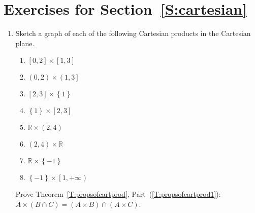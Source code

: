 \section*{Exercises for Section~\ref{S:cartesian}}
%
\begin{enumerate}
\xitem Let   $A = \left\{ {1,2} \right\}$,  $B = \left\{ {a,b,c,d} \right\}$, and  $C = \left\{ {1,a,b} \right\}$.  Use the roster method to list all of the elements of each of the following sets: \label{exer:sec44-1}

\begin{multicols}{2} \begin{enumerate}
\item $A \times B$
\item $B \times A$
\item $A \times C$
\item $A^2$
\item $A \times \left( {B \cap C} \right)$
\item $\left( {A \times B} \right) \cap \left( {A \times C} \right)$
\item $A \times \emptyset $
\item $B \times \left\{ 2 \right\}$
\end{enumerate}
\end{multicols}


\item Sketch a graph of each of the following Cartesian products in the Cartesian plane.
\label{exer:sec44-2}
%
\begin{multicols}{2}
\begin{enumerate}
  \item $\left[ {0,2} \right] \times \left[ {1,3} \right]$
  \item $\left( {0,2} \right) \times \left( {1,3} \right]$
  \item $\left[ {2,3} \right] \times \left\{ 1 \right\}$
  \item $\left\{ 1 \right\} \times \left[ {2,3} \right]$
  \item $\mathbb{R} \times \left( {2,4} \right)$
  \item $\left( {2,4} \right) \times \mathbb{R}$
  \item $\mathbb{R} \times \left\{ { - 1} \right\}$
  \item $\left\{ { - 1} \right\} \times \left[ {1, + \infty } \right)$
\end{enumerate}
\end{multicols}

\xitem Prove Theorem~\ref{T:propsofcartprod}, Part~(\ref{T:propsofcartprod1}): $A \times \left( {B \cap C} \right) = \left( {A \times B} \right) \cap \left( {A \times C} \right)$. \label{exer:sec44-3}
	

\end{enumerate}
